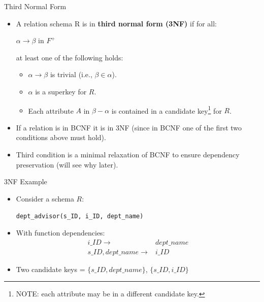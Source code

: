 \documentclass[aspectratio=169]{beamer}
\begin{document}
\begin{frame}{Third Normal Form}
    \begin{itemize}
        \item A relation schema R is in \textbf{third normal form (3NF)} if for all:
            \begin{center}
                $\alpha \rightarrow \beta$ in $F^+$
            \end{center}
        at least one of the following holds:
            \begin{itemize}
                \item $\alpha \rightarrow \beta$ is trivial (i.e., $\beta \in \alpha$).
                \item $\alpha$ is a superkey for $R$.
                \item Each attribute $A$ in $\beta - \alpha$ is contained in a candidate key\footnote{NOTE: each attribute may be in a different candidate key.} for $R$.
            \end{itemize}
        \item If a relation is in BCNF it is in 3NF (since in BCNF one of the first two conditions above must hold).
        \item Third condition is a minimal relaxation of BCNF to ensure dependency preservation (will see why later).
    \end{itemize}
\end{frame}

\begin{frame}{3NF Example}
    \begin{itemize}
        \item Consider a schema $R$:
            \begin{center}
                \texttt{dept\_advisor(s\_ID, i\_ID, dept\_name)}
            \end{center}
        \item With function dependencies:
            \begin{equation*}
                \begin{align*}
                    i\_ID \rightarrow& dept\_name \\
                    s\_ID, dept\_name \rightarrow& i\_ID
                \end{align*}
            \end{equation*}
        \item Two candidate keys = $\{s\_ID, dept\_name\}$, $\{s\_ID, i\_ID\}$
    \end{itemize}
\end{frame}
\end{document}

